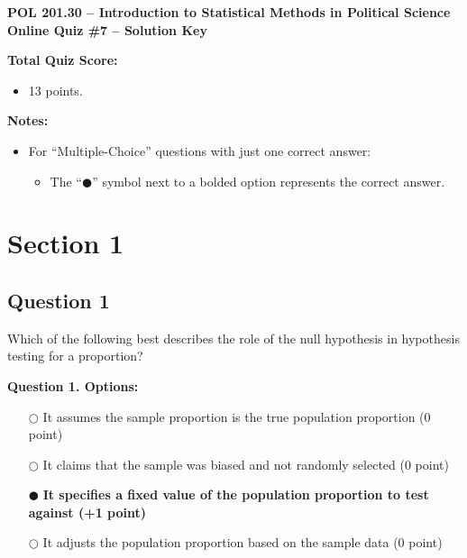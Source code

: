 \documentclass[12pt]{article}
\newcommand{\questionsep}{\vspace{1em}}
\begin{document}
\begin{center}
    \Large\textbf{POL 201.30 – Introduction to Statistical Methods in Political Science} \\
    \vspace{0.5em} %
    \large\textbf{Online Quiz \#7 – Solution Key}
\end{center}
\vspace{1em} %

\noindent\textbf{Total Quiz Score:}
\begin{itemize}[label=\textbullet, leftmargin=*, itemsep=0.2em, topsep=0.2em]
    \item 13 points.
\end{itemize}
\vspace{0.5em}

\noindent\textbf{Notes:}
\begin{itemize}[label=\textbullet, leftmargin=*, itemsep=0.2em, topsep=0.2em]
    \item For “Multiple-Choice” questions with just one correct answer:
    \begin{itemize}[label=-, leftmargin=*, itemsep=0.2em, topsep=0.2em] %
        \item The “$\mdlgblkcircle$” symbol next to a bolded option represents the correct answer.
    \end{itemize}
\end{itemize}
\questionsep

\section*{Section 1} 

\subsection*{Question 1 }
Which of the following best describes the role of the null hypothesis in hypothesis testing for a proportion?

\medskip\noindent\textbf{Question 1. Options:}
\begin{itemize}[leftmargin=2em, labelsep=0.5em, itemsep=0.3em, topsep=0.3em]
    \item[$\bigcirc$] It assumes the sample proportion is the true population proportion (0 point)
    \item[$\bigcirc$] It claims that the sample was biased and not randomly selected (0 point)
    \item[$\mdlgblkcircle$] \textbf{It specifies a fixed value of the population proportion to test against (+1 point)}
    \item[$\bigcirc$] It adjusts the population proportion based on the sample data (0 point)
\end{itemize}
\end{document}
